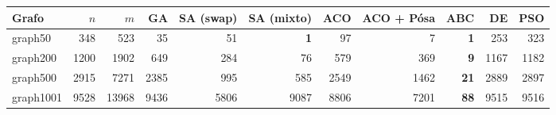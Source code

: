 \begin{tabular}{lrrrrrrrrrr}
\toprule
Grafo & $n$ & $m$ & GA & SA (swap) & SA (mixto) & ACO & ACO + Pósa & ABC & DE & PSO \\
\midrule
graph50 & 348 & 523 & 35 & 51 & \textbf{1} & 97 & 7 & \textbf{1} & 253 & 323 \\
graph200 & 1200 & 1902 & 649 & 284 & 76 & 579 & 369 & \textbf{9} & 1167 & 1182 \\
graph500 & 2915 & 7271 & 2385 & 995 & 585 & 2549 & 1462 & \textbf{21} & 2889 & 2897 \\
graph1001 & 9528 & 13968 & 9436 & 5806 & 9087 & 8806 & 7201 & \textbf{88} & 9515 & 9516 \\
\bottomrule
\end{tabular}
